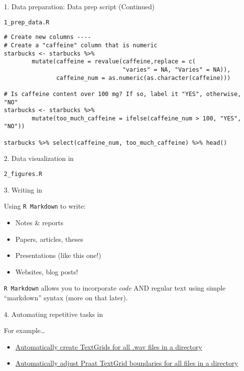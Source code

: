 \documentclass[
  ignorenonframetext,
]{beamer}
\providecommand{\tightlist}{%
  \setlength{\itemsep}{0pt}\setlength{\parskip}{0pt}}
\begin{document}
\begin{frame}[fragile]{1. Data preparation: Data prep script
(Continued)}
\protect\hypertarget{data-preparation-data-prep-script-continued}{}

\texttt{1\_prep\_data.R}

\begin{verbatim}
# Create new columns ----
# Create a "caffeine" column that is numeric
starbucks <- starbucks %>%
        mutate(caffeine = revalue(caffeine,replace = c(
                                  "varies" = NA, "Varies" = NA)),
               caffeine_num = as.numeric(as.character(caffeine)))

# Is caffeine content over 100 mg? If so, label it "YES", otherwise, "NO"
starbucks <- starbucks %>%
        mutate(too_much_caffeine = ifelse(caffeine_num > 100, "YES", "NO"))

starbucks %>% select(caffeine_num, too_much_caffeine) %>% head()
\end{verbatim}

\end{frame}

\begin{frame}[fragile]{2. Data visualization in }
\protect\hypertarget{data-visualization-in}{}

\texttt{2\_figures.R}

\end{frame}

\begin{frame}[fragile]{3. Writing in }
\protect\hypertarget{writing-in}{}

Using \texttt{R\ Markdown} to write:

\begin{itemize}
\tightlist
\item
  Notes \& reports
\item
  Papers, articles, theses
\item
  Presentations (like this one!)
\item
  Websites, blog posts!
\end{itemize}

\texttt{R\ Markdown} allows you to incorporate \emph{code} AND regular
text using simple ``markdown'' syntax (more on that later).

\end{frame}

\begin{frame}{4. Automating repetitive tasks in }
\protect\hypertarget{automating-repetitive-tasks-in}{}

For example\ldots{}

\begin{itemize}
\tightlist
\item
  \href{https://github.com/thealk/PraatScripts/blob/master/Editing_audio_stimuli/createTextGrid.praat}{Automatically
  create TextGrids for all .wav files in a directory}
\item
  \href{https://github.com/thealk/PraatScripts/blob/master/Praat_scripting_tutorial/3_adjustBoundaries.praat}{Automatically
  adjust Praat TextGrid boundaries for all files in a directory}
\end{itemize}

\end{frame}
\end{document}
